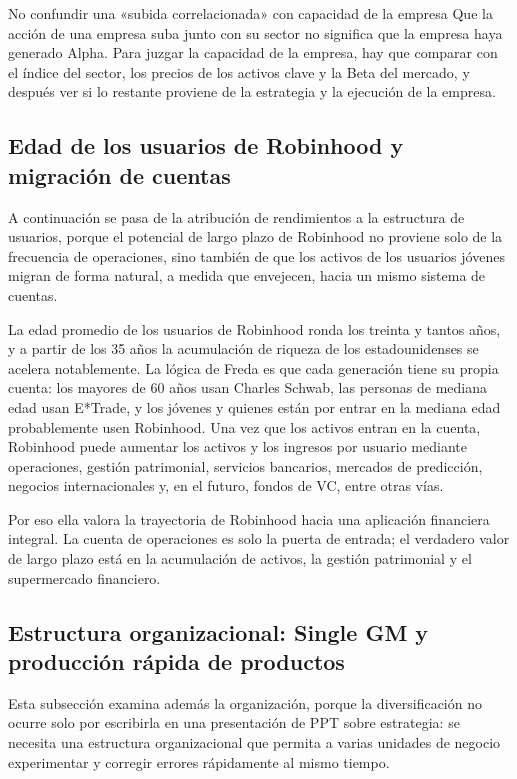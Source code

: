 \documentclass[a4paper]{article}
\begin{document}
\begin{warningbox}{No confundir una «subida correlacionada» con capacidad de la empresa}
Que la acción de una empresa suba junto con su sector no significa que la empresa haya generado Alpha. Para juzgar la capacidad de la empresa, hay que comparar con el índice del sector, los precios de los activos clave y la Beta del mercado, y después ver si lo restante proviene de la estrategia y la ejecución de la empresa.
\end{warningbox}

\subsection{Edad de los usuarios de Robinhood y migración de cuentas}

A continuación se pasa de la atribución de rendimientos a la estructura de usuarios, porque el potencial de largo plazo de Robinhood no proviene solo de la frecuencia de operaciones, sino también de que los activos de los usuarios jóvenes migran de forma natural, a medida que envejecen, hacia un mismo sistema de cuentas.

La edad promedio de los usuarios de Robinhood ronda los treinta y tantos años, y a partir de los 35 años la acumulación de riqueza de los estadounidenses se acelera notablemente. La lógica de Freda es que cada generación tiene su propia cuenta: los mayores de 60 años usan Charles Schwab, las personas de mediana edad usan E*Trade, y los jóvenes y quienes están por entrar en la mediana edad probablemente usen Robinhood. Una vez que los activos entran en la cuenta, Robinhood puede aumentar los activos y los ingresos por usuario mediante operaciones, gestión patrimonial, servicios bancarios, mercados de predicción, negocios internacionales y, en el futuro, fondos de VC, entre otras vías.

Por eso ella valora la trayectoria de Robinhood hacia una aplicación financiera integral. La cuenta de operaciones es solo la puerta de entrada; el verdadero valor de largo plazo está en la acumulación de activos, la gestión patrimonial y el supermercado financiero.

\subsection{Estructura organizacional: Single GM y producción rápida de productos}

Esta subsección examina además la organización, porque la diversificación no ocurre solo por escribirla en una presentación de PPT sobre estrategia: se necesita una estructura organizacional que permita a varias unidades de negocio experimentar y corregir errores rápidamente al mismo tiempo.
\end{document}
